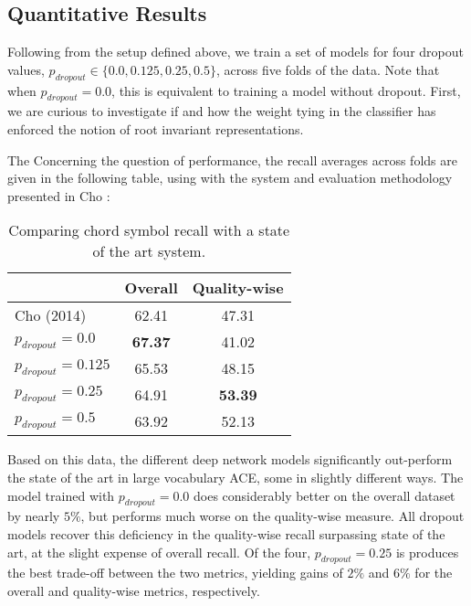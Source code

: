\subsection{Quantitative Results}
\label{subsec:quantitative_results}

Following from the setup defined above, we train a set of models for four dropout values, $p_{dropout} \in \{0.0, 0.125, 0.25, 0.5\}$, across five folds of the data.
Note that when $p_{dropout} = 0.0$, this is equivalent to training a model without dropout.
First, we are curious to investigate if and how the weight tying in the classifier has enforced the notion of root invariant representations.

The
Concerning the question of performance, the recall averages across folds are given in the following table, using with the system and evaluation methodology presented in Cho \cite{Cho2014PhD}:

\begin{table}[h]
\begin{center}
\caption{Comparing chord symbol recall with a state of the art system.}
\label{tab:base_stats}
\begin{tabular}{l | c | c}

                      & Overall & Quality-wise  \\
\hline
Cho (2014)            & 62.41 & 47.31 \\
\hline
$p_{dropout} = 0.0$   & \textbf{67.37} & 41.02 \\
$p_{dropout} = 0.125$ & 65.53 & 48.15 \\
$p_{dropout} = 0.25$  & 64.91 & \textbf{53.39} \\
$p_{dropout} = 0.5$   & 63.92 & 52.13 \\
\hline
\end{tabular}
\end{center}
\end{table}

Based on this data, the different deep network models significantly out-perform the state of the art in large vocabulary ACE, some in slightly different ways.
The model trained with $p_{dropout} = 0.0$ does considerably better on the overall dataset by nearly $5\%$, but performs much worse on the quality-wise measure.
All dropout models recover this deficiency in the quality-wise recall surpassing state of the art, at the slight expense of overall recall.
Of the four, $p_{dropout} = 0.25$ is produces the best trade-off between the two metrics, yielding gains of $2\%$ and $6\%$ for the overall and quality-wise metrics, respectively.

